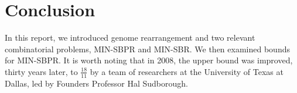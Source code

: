 \section{Conclusion}
In this report, we introduced genome rearrangement and two relevant combinatorial problems, MIN-SBPR and MIN-SBR. We then examined bounds for MIN-SBPR. It is worth noting that in 2008, the upper bound was improved, thirty years later, to $\frac{18}{11}$ by a team of researchers at the University of Texas at Dallas, led by Founders Professor Hal Sudborough\cite{new_bounds}. 